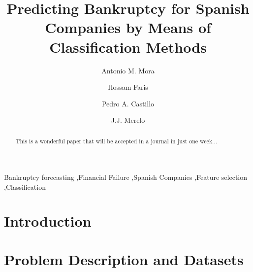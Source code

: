 \documentclass[a4paper,10pt,onecolumn,preprint,3p]{elsarticle}
\begin{document}

\title{Predicting Bankruptcy for Spanish Companies by Means of Classification Methods} 


\author[ugr]{Antonio M. Mora}
\author[abd]{Hossam Faris}
\author[ugr]{Pedro A. Castillo}
\author[ugr]{J.J. Merelo}


\address[ugr]{Department of Computer Architecture and Computer Technology, ETSIIT and CITIC \\
University of Granada, Granada, Spain. Tel: +34958241778. Fax: +34958248993}
\address[abd]{Business Information Technology Department, King Abdullah II School for Information Technology \\
The University of Jordan, Amman, Jordan}

\maketitle

\begin{abstract}
This is a wonderful paper that will be accepted in a journal in just one week...
\end{abstract}


\begin{keyword}
Bankruptcy forecasting \sep Financial Failure \sep Spanish Companies \sep Feature selection \sep Classification  
\end{keyword}


\section{Introduction}
\label{sec:intro}

\section{Problem Description and Datasets}
\label{sec:problem_data}
\end{document}
